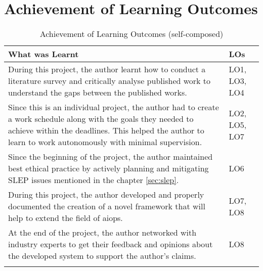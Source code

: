 \section{Achievement of Learning Outcomes}

\begin{longtable}{|p{135mm}|p{25mm}|}
    \hline
    \textbf{What was Learnt} & \textbf{LOs} \\ \hline
    During this project, the author learnt how to conduct a literature survey and critically analyse published work to understand the gaps between the published works. & LO1, LO3, LO4 \\ \hline
    Since this is an individual project, the author had to create a work schedule along with the goals they needed to achieve within the deadlines. This helped the author to learn to work autonomously with minimal supervision. & LO2, LO5, LO7 \\ \hline
    Since the beginning of the project, the author maintained best ethical practice by actively planning and mitigating SLEP issues mentioned in the chapter \ref{sec:slep}. & LO6 \\ \hline
    During this project, the author developed and properly documented the creation of a novel framework that will help to extend the field of \ac{aiops}. & LO7, LO8 \\ \hline
    At the end of the project, the author networked with industry experts to get their feedback and opinions about the developed system to support the author's claims. & LO8 \\ \hline
    \caption{Achievement of Learning Outcomes (self-composed)}
  \end{longtable}
  